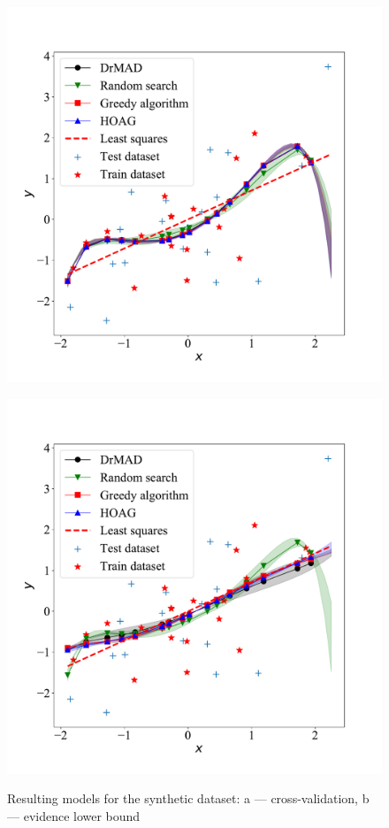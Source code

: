 \documentclass[smallcondensed]{svjour3}
\begin{document}
    \begin{figure}

    \begin{subfloat}[]{
    \includegraphics[width=0.5\linewidth]{plots/Fig_poly_cv2.pdf}
    }
    \end{subfloat}
    \begin{subfloat}[]{
    \includegraphics[width=0.5\linewidth]{plots/Fig_poly_var2.pdf}
    }
    \end{subfloat}

 \caption{Resulting models for the synthetic dataset: a --- cross-validation, b --- evidence lower bound}
  \label{fig:poly}
   
    \end{figure}
\end{document}
